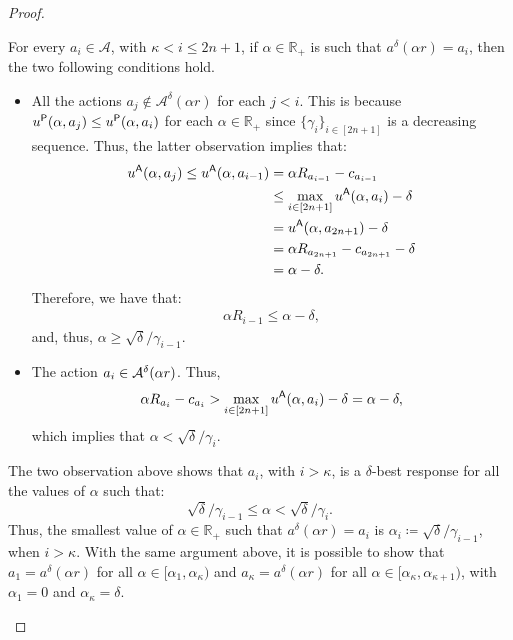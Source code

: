 \begin{proof}
\begin{enumerate}
		
		
		For every $a_i \in \mathcal{A}$, with $\kappa<i \le 2n+1$, if $\alpha \in \mathbb{R}_{+}$ is such that $a^\delta(\alpha r)= a_i$, then the two following conditions hold.
		\begin{itemize}
			\item All the actions $a_j \not \in \mathcal{A}^\delta(\alpha r)$ for each $j < i$.
			This is because $u^{\mathsf{P}}(\alpha, a_j) \le u^{\mathsf{P}}(\alpha, a_i)$ for each $\alpha \in \mathbb{R}_{+}$ since $\{\gamma_i\}_{i \in [2n+1]}$ is a decreasing sequence.
			Thus, the latter observation implies that:
			\begin{align*}
				u^{\mathsf{A}}(\alpha, a_{j}) 
				\le u^{\mathsf{A}}(\alpha, a_{i-1}) & = \alpha R_{a_{i-1}} - c_{a_{i-1}}\\
				& \le \max_{i \in [2n+1]} u^{\mathsf{A}}(\alpha, a_{i}) -\delta\\
				& = u^{\mathsf{A}}(\alpha, a_{{2n+1}}) -\delta  \\
				&= \alpha R_{a_{2n+1}} -c_{a_{{2n+1}}} - \delta \\
				& = \alpha -\delta.
			\end{align*}
			Therefore, we have that: 
			\begin{align*}
				\alpha R_{i-1}\le \alpha - \delta, 
			\end{align*}
			and, thus, $\alpha \ge {\sqrt{\delta}} / {\gamma_{i-1}}$. %
			
			\item The action $a_i \in \mathcal{A}^\delta(\alpha r)$. Thus, 
			$$ \alpha R_{a_i} - c_{a_i} > \max_{i \in [2n+1]} u^{\mathsf{A}}(\alpha, a_{i}) -\delta = \alpha -\delta,
			$$
			which implies that $\alpha < {\sqrt{\delta}} / {\gamma_{i}}$.
		\end{itemize}
		The two observation above shows that $a_i$, with $i > \kappa$, is a $\delta$-best response for all the values of $\alpha$ such that:
		$${\sqrt{\delta}} / {\gamma_{i-1}} \le \alpha < {\sqrt{\delta}} / {\gamma_{i}}.$$
		Thus, the smallest value of $\alpha \in \mathbb{R}_{+}$ such that $a^\delta(\alpha r) = a_i$ is $\alpha_i \coloneqq {\sqrt{\delta}} / {\gamma_{i-1}}$, when $i > \kappa$.
		With the same argument above, it is possible to show that $a_1=a^\delta(\alpha r)$ for all $\alpha \in [\alpha_1,\alpha_\kappa)$ and $a_\kappa=a^\delta(\alpha r)$ for all $\alpha \in [\alpha_\kappa, \alpha_{\kappa+1})$, with $\alpha_1=0$ and $\alpha_\kappa=\delta$.
		

\end{enumerate}
\end{proof}
